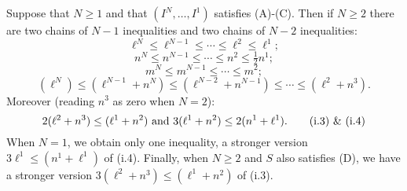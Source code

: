 \documentclass[10pt]{article}
\newcommand{\minDim}{m}
\begin{document}
\begin{KoszulSequenceCombinatorics}


\begin{cor}Suppose that $N\geq1$ and that $(I^N,\ldots,I^1)$ satisfies \textup{(A)}-\textup{(C)}. %
Then if $N\geq2$ there are two chains of $N-1$ inequalities and two chains of $N-2$ inequalities:
\begin{equation}
\ell^N\leq \ell^{N-1}\leq\cdots \leq \ell^2\leq \ell^1;\tag{c.0}
\end{equation}
\begin{equation}
n^N\leq n^{N-1}\leq\cdots \leq n^2\leq \tfrac{1}{2}n^1;\tag{c.1}
\end{equation}
\begin{equation}
\minDim^N\leq \minDim^{N-1}\leq\cdots \leq \minDim^2;\tag{c.2}
\end{equation}
\begin{equation}
(\ell^N)\leq(\ell^{N-1}+n^N) \leq(\ell^{N-2}+n^{N-1})\leq\cdots \leq (\ell^2+n^3).\tag{c.3}
\end{equation}
Moreover (reading $n^3$ as zero when $N=2$):
\begin{equation}
2(\ell^2+n^3)\leq(\ell^1+n^2)\textup{\ and\ }3(\ell^1+n^2)\leq 2(n^1+\ell^1).\tag{i.3) \& (i.4}
\end{equation}
When $N=1$, we obtain only one inequality, a stronger version $3\ell^1\leq(n^1+\ell^1)$ of \textup{(i.4)}.
Finally, when $N\geq2$ and $S$ also satisfies \textup{(D)}, we have a stronger version $3(\ell^2+n^3)\leq(\ell^1+n^2)$ of \textup{(i.3)}.
\end{cor}


\end{KoszulSequenceCombinatorics}
\end{document}
